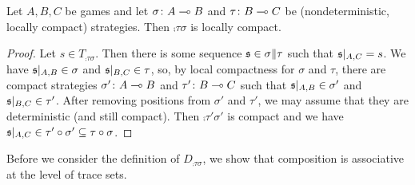 \documentclass{article}
\begin{document}
\begin{proposition}
  Let $A,B,C$ be games and let $\sigma\colon A\multimap B$ and $\tau\colon B\multimap C$ be (nondeterministic, locally compact) strategies.  Then $\comp\tau\sigma$ is locally compact.
  \begin{proof}
    Let $s\in T_{\comp\tau\sigma}$.  Then there is some sequence $\mathfrak s\in\sigma\|\tau$ such that $\mathfrak s\vert_{A,C}=s$.  We have $\mathfrak s\vert_{A,B}\in\sigma$ and $\mathfrak s\vert_{B,C}\in\tau$, so, by local compactness for $\sigma$ and $\tau$, there are compact strategies $\sigma'\colon A\multimap B$ and $\tau'\colon B\multimap C$ such that $\mathfrak s\vert_{A,B}\in\sigma'$ and $\mathfrak s\vert_{B,C}\in\tau'$.  After removing positions from $\sigma'$ and $\tau'$, we may assume that they are deterministic (and still compact).  Then $\comp{\tau'}{\sigma'}$ is compact and we have $\mathfrak s\vert_{A,C}\in\tau' \circ \sigma'\subseteq\tau \circ \sigma$.
  \end{proof}
\end{proposition}

Before we consider the definition of $D_{\comp\tau\sigma}$, we show that composition is associative at the level of trace sets.  
\end{document}
